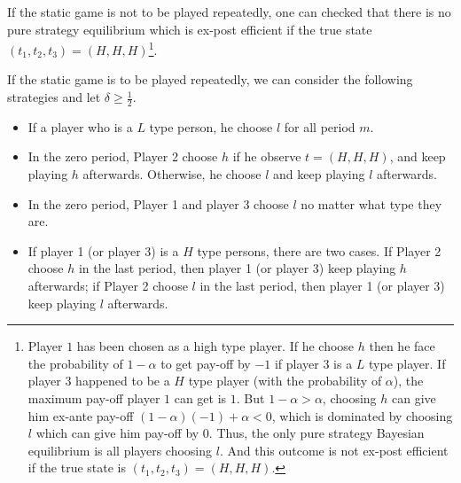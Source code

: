 \documentclass[12pt,letter]{article}
\theoremstyle{remark}
\theoremstyle{remark}
\theoremstyle{claim}
\begin{document}
\begin{center}
\end{center}

If the static game is not to be played repeatedly, one can checked that there is no pure strategy equilibrium which is ex-post efficient if the true state $(t_1,t_2,t_3)=(H,H,H)$\footnote{Player $1$ has been chosen as a high type player. If he choose $h$ then he face the probability of $1-\alpha$ to get pay-off by $-1$ if player $3$ is a $L$ type player. If player $3$ happened to be a $H$ type player (with the probability of $\alpha$), the maximum pay-off player $1$ can get is $1$. But $1-\alpha>\alpha$, choosing $h$ can give him ex-ante pay-off $(1-\alpha)(-1)+\alpha<0$, which is dominated by choosing $l$ which can give him pay-off by $0$. Thus, the only pure strategy Bayesian equilibrium is all players choosing $l$. And this outcome is not ex-post efficient if the true state is $(t_1,t_2,t_3)=(H,H,H)$.}.   

If the static game is to be played repeatedly, we can consider the following strategies and let $\delta\geq \frac{1}{2}$.

\begin{itemize}

\item If a player who is a $L$ type person, he choose $l$ for all period $m$.
\item In the zero period, Player 2 choose $h$ if he observe $t=(H,H,H)$, and keep playing $h$ afterwards. Otherwise, he choose $l$ and keep playing $l$ afterwards. 
\item In the zero period, Player 1 and player 3 choose $l$ no matter what type they are.
\item If player 1 (or player 3) is a $H$ type persons, there are two cases. If Player 2 choose $h$ in the last period, then player 1 (or player 3) keep playing $h$ afterwards; if Player 2 choose $l$ in the last period, then player 1 (or player 3) keep playing $l$ afterwards.
\end{itemize}
\end{document}
